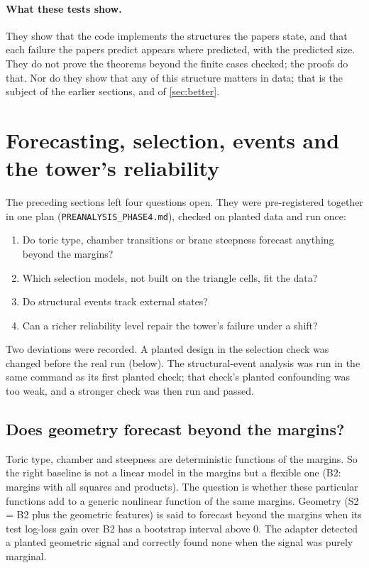 \documentclass[11pt]{article}
\theoremstyle{definition}
\theoremstyle{remark}
\begin{document}
\paragraph{What these tests show.} They show that the code implements the structures the papers state, and that each failure the papers
predict appears where predicted, with the predicted size. They do not prove the theorems beyond the finite cases checked; the proofs do
that. Nor do they show that any of this structure matters in data; that is the subject of the earlier sections, and of
\cref{sec:better}.

\section{Forecasting, selection, events and the tower's reliability}\label{sec:phase4}

The preceding sections left four questions open. They were pre-registered together in one plan
(\texttt{PREANALYSIS\_PHASE4.md}), checked on planted data and run once:
\begin{enumerate}[leftmargin=*,nosep]
\item Do toric type, chamber transitions or brane steepness forecast anything beyond the margins?
\item Which selection models, not built on the triangle cells, fit the data?
\item Do structural events track external states?
\item Can a richer reliability level repair the tower's failure under a shift?
\end{enumerate}
Two deviations were recorded. A planted design in the selection check was changed before the real run (below). The structural-event
analysis was run in the same command as its first planted check; that check's planted confounding was too weak, and a stronger check
was then run and passed.

\subsection{Does geometry forecast beyond the margins?}\label{sec:forecast}

Toric type, chamber and steepness are deterministic functions of the margins. So the right baseline is not a linear model in the
margins but a flexible one (B2: margins with all squares and products). The question is whether these particular functions add to a
generic nonlinear function of the same margins. Geometry (S2 = B2 plus the geometric features) is said to forecast beyond the margins
when its test log-loss gain over B2 has a bootstrap interval above $0$. The adapter detected a planted geometric signal and correctly
found none when the signal was purely marginal.
\end{document}
